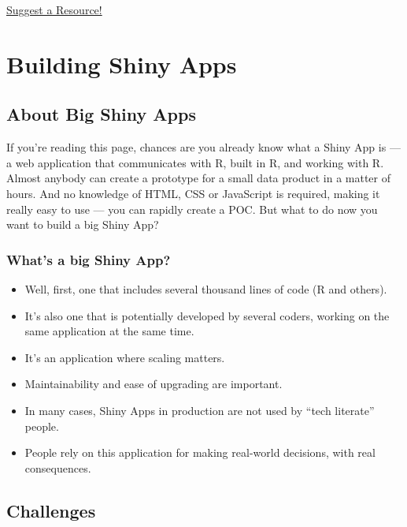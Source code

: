 \documentclass[]{book}
\providecommand{\tightlist}{%
  \setlength{\itemsep}{0pt}\setlength{\parskip}{0pt}}
\begin{document}
\href{https://github.com/ThinkR-open/building-shiny-apps-workflow/issues}{Suggest a Resource!}

\hypertarget{part-building-shiny-apps}{%
\part{Building Shiny Apps}\label{part-building-shiny-apps}}

\hypertarget{bigshinyapp}{%
\chapter{About Big Shiny Apps}\label{bigshinyapp}}

If you're reading this page, chances are you already know what a Shiny App is --- a web application that communicates with R, built in R, and working with R. Almost anybody can create a prototype for a small data product in a matter of hours. And no knowledge of HTML, CSS or JavaScript is required, making it really easy to use --- you can rapidly create a POC. But what to do now you want to build a big Shiny App?

\hypertarget{whats-a-big-shiny-app}{%
\section{What's a big Shiny App?}\label{whats-a-big-shiny-app}}

\begin{itemize}
\tightlist
\item
  Well, first, one that includes several thousand lines of code (R and others).
\item
  It's also one that is potentially developed by several coders, working on the same application at the same time.
\item
  It's an application where scaling matters.
\item
  Maintainability and ease of upgrading are important.
\item
  In many cases, Shiny Apps in production are not used by ``tech literate'' people.
\item
  People rely on this application for making real-world decisions, with real consequences.
\end{itemize}

\hypertarget{challenges}{%
\chapter{Challenges}\label{challenges}}
\end{document}

